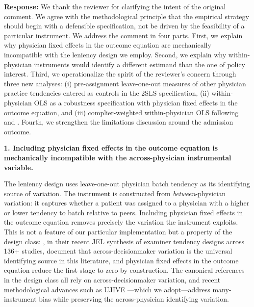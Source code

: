 \documentclass[11pt]{article}
\newcommand{\1}{\hbox{\rm 1\kern-.35em 1}}
\begin{document}
\noindent\textbf{Response:} \color{blue} We thank the reviewer for clarifying the intent of the original comment. We agree with the methodological principle that the empirical strategy should begin with a defensible specification, not be driven by the feasibility of a particular instrument. We address the comment in four parts. First, we explain why physician fixed effects in the outcome equation are mechanically incompatible with the leniency design we employ. Second, we explain why within-physician instruments would identify a different estimand than the one of policy interest. Third, we operationalize the spirit of the reviewer's concern through three new analyses: (i) pre-assignment leave-one-out measures of other physician practice tendencies entered as controls in the 2SLS specification, (ii) within-physician OLS as a robustness specification with physician fixed effects in the outcome equation, and (iii) complier-weighted within-physician OLS following \citet{bhuller2020incarceration} and \citet{dobbie2018effects}. Fourth, we strengthen the limitations discussion around the admission outcome.

\textbf{1. Including physician fixed effects in the outcome equation is mechanically incompatible with the across-physician instrumental variable.}

The leniency design uses leave-one-out physician batch tendency as its identifying source of variation. The instrument is constructed from \textit{between}-physician variation: it captures whether a patient was assigned to a physician with a higher or lower tendency to batch relative to peers. Including physician fixed effects in the outcome equation removes precisely the variation the instrument exploits. This is not a feature of our particular implementation but a property of the design class: \citet{chyn2025examiner}, in their recent JEL synthesis of examiner tendency designs across 136+ studies, document that across-decisionmaker variation is the universal identifying source in this literature, and physician fixed effects in the outcome equation reduce the first stage to zero by construction. The canonical references in the design class \citep{kling2006incarceration, dahl2014family, dobbie2018effects, bhuller2020incarceration} all rely on across-decisionmaker variation, and recent methodological advances such as UJIVE \citep{kolesar2013estimation, goldsmithpinkham2025leniencydesignsoperatorsmanual}---which we adopt---address many-instrument bias while preserving the across-physician identifying variation.
\end{document}
